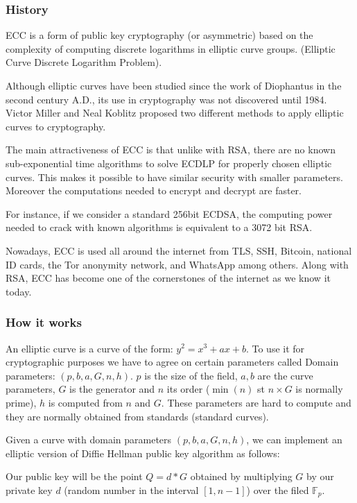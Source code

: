 \subsubsection{History}

ECC is a form of public key cryptography (or asymmetric) based on the complexity
of computing discrete logarithms in elliptic curve groups. (Elliptic Curve
Discrete Logarithm Problem).

Although elliptic curves have been studied since the work of Diophantus in the
second century A.D., its use in cryptography was not discovered until 1984.
Victor Miller and Neal Koblitz proposed two different methods to apply elliptic
curves to cryptography. \cite{barsagade_overview_2014}

The main attractiveness of ECC is that unlike with RSA, there are no known
sub-exponential time algorithms to solve ECDLP for properly chosen elliptic
curves. This makes it possible to have similar security with smaller parameters.
Moreover the computations needed to encrypt and decrypt are faster.

For instance, if we consider a standard 256bit ECDSA, the computing power needed
to crack with known algorithms is equivalent to a 3072 bit RSA.
\cite{roetteler_quantum_2017}

Nowadays, ECC is used all around the internet from TLS, SSH, Bitcoin, national
ID cards, the Tor anonymity network, and WhatsApp among others. Along with RSA,
ECC has become one of the cornerstones of the internet as we know it today.

\subsubsection{How it works}

An elliptic curve is a curve of the form: $y^2 = x^3 + ax + b$. To use it for
cryptographic purposes we have to agree on certain parameters called Domain
parameters: $(p,b,a,G,n,h)$. $p$ is the size of the field, $a,b$ are the curve
parameters, $G$ is the generator and $n$ its order ($\min(n)$ st $ n \times G$
is normally prime), $h$ is computed from $n$ and $G$. These parameters are hard
to compute and they are normally obtained from standards (standard curves).

Given a curve with domain parameters $(p,b,a,G,n,h)$, we can implement an
elliptic version of Diffie Hellman public key algorithm as follows:

Our public key will be the point $Q = d * G$ obtained by multiplying $G$ by our
private key $d$ (random number in the interval $[1, n-1]$) over the filed
$\mathds{F}_p$.

